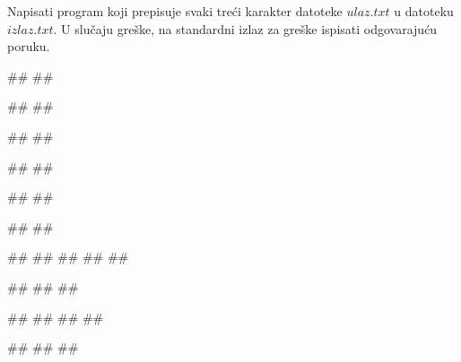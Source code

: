\begin{Exercise}[label=p3_02] 
Napisati program koji prepisuje svaki treći karakter datoteke $ulaz.txt$ u datoteku $izlaz.txt$.
U slučaju greške, na standardni izlaz za greške ispisati odgovarajuću poruku.

\begin{minitest}
\begin{upotreba}{1}
##
##

##
##
\end{upotreba}
\end{minitest}
\begin{minitest}
\begin{upotreba}{2}
##
##

##
##
\end{upotreba}
\end{minitest}
\begin{minitest}
\begin{upotreba}{3}
##
##

##
##
\end{upotreba}
\end{minitest}

\begin{minitest}
\begin{upotreba}{4}
##
##
##
##
##

##
##
##
\end{upotreba}
\end{minitest}
\begin{minitest}
\begin{upotreba}{5}
##
##
##
##

##
##
##
\end{upotreba}
\end{minitest}


\end{Exercise}
\begin{Answer}[ref=p3_02]
\end{Answer}


